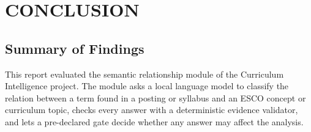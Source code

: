 \chapter{CONCLUSION}
\label{ch:conclusion}

\section{Summary of Findings}
\label{sec:summary}

This report evaluated the semantic relationship module of the Curriculum Intelligence project. The module asks a local language model to classify the relation between a term found in a posting or syllabus and an ESCO concept or curriculum topic, checks every answer with a deterministic evidence validator, and lets a pre-declared gate decide whether any answer may affect the analysis.


